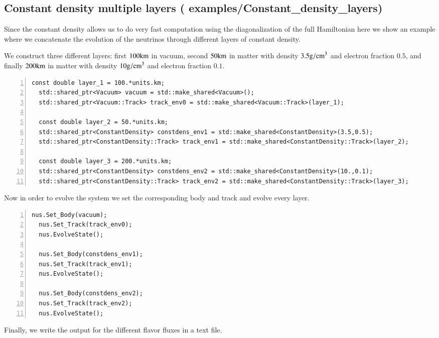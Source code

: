 \documentclass[3p,12pt]{elsarticle}
\newcommand{\ttf}{\ttfamily}
\begin{document}
\subsection{Constant density multiple layers \textnormal{({\ttf
      examples/Constant\_density\_layers})}}
Since the constant density allows us to do very fast computation using
the diagonalization of the full Hamiltonian here we show an example
where we concatenate the evolution of the neutrinos through different
layers of constant density.

We construct three different layers: first $100{\rm km}$ in
vacuum, second $50{\rm km}$ in matter with density $3.5{\rm g/cm}^3$ and
 electron fraction $0.5$, and finally $200{\rm km}$ in matter with
 density $10{\rm g/cm}^3$ and electron fraction $0.1$.
 
\begin{lstlisting}[frame=leftline, numbers =
  left,breaklines=true,label = ex:sin1]
  const double layer_1 = 100.*units.km;
  std::shared_ptr<Vacuum> vacuum = std::make_shared<Vacuum>();
  std::shared_ptr<Vacuum::Track> track_env0 = std::make_shared<Vacuum::Track>(layer_1);

  const double layer_2 = 50.*units.km;
  std::shared_ptr<ConstantDensity> constdens_env1 = std::make_shared<ConstantDensity>(3.5,0.5); 
  std::shared_ptr<ConstantDensity::Track> track_env1 = std::make_shared<ConstantDensity::Track>(layer_2);

  const double layer_3 = 200.*units.km;
  std::shared_ptr<ConstantDensity> constdens_env2 = std::make_shared<ConstantDensity>(10.,0.1);
  std::shared_ptr<ConstantDensity::Track> track_env2 = std::make_shared<ConstantDensity::Track>(layer_3);
\end{lstlisting}

Now in order to evolve the system we set the corresponding body
and track and evolve every layer.

\begin{lstlisting}[frame=leftline, numbers =
  left,breaklines=true,label = ex:sin1]
  nus.Set_Body(vacuum);
  nus.Set_Track(track_env0);
  nus.EvolveState();

  nus.Set_Body(constdens_env1);
  nus.Set_Track(track_env1);
  nus.EvolveState();

  nus.Set_Body(constdens_env2);
  nus.Set_Track(track_env2);
  nus.EvolveState();
\end{lstlisting}

Finally, we write the output for the different flavor fluxes in a text file.
\end{document}

